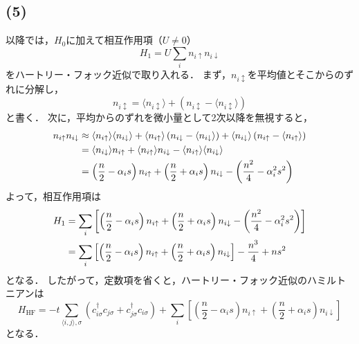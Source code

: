 \documentclass[a4paper,11pt]{jsarticle}
\begin{document}
\subsection*{(5)}
以降では，$H_0$に加えて相互作用項（$U\neq 0$）
\begin{equation}
  H_1 = U \sum_i n_{i\uparrow} n_{i\downarrow}
\end{equation}
をハートリー・フォック近似で取り入れる．
まず，$n_{i\updownarrow}$を平均値とそこからのずれに分解し，
\begin{equation}
  n_{i\updownarrow} = \langle n_{i\updownarrow} \rangle + \left(n_{i\updownarrow} - \langle n_{i\updownarrow} \rangle\right)
\end{equation}
と書く．
次に，平均からのずれを微小量として2次以降を無視すると，
\begin{align}
  n_{i\uparrow} n_{i\downarrow} 
  &\approx \langle n_{i\uparrow} \rangle \langle n_{i\downarrow} \rangle 
  + \langle n_{i\uparrow} \rangle \left(n_{i\downarrow} - \langle n_{i\downarrow} \rangle\right)
  + \langle n_{i\downarrow} \rangle \left(n_{i\uparrow} - \langle n_{i\uparrow} \rangle\right)\notag\\
  &= \langle n_{i\downarrow} \rangle n_{i\uparrow} + \langle n_{i\uparrow} \rangle n_{i\downarrow} - \langle n_{i\uparrow} \rangle \langle n_{i\downarrow} \rangle  \notag\\
  &= \left(\frac{n}{2}-\alpha_{i}s\right)n_{i\uparrow} + \left(\frac{n}{2}+\alpha_{i}s\right)n_{i\downarrow} - \left(\frac{n^2}{4} - \alpha_i^2 s^2\right)
\end{align}
よって，相互作用項は
\begin{align}
  H_1 &= \sum_i \left[ \left(\frac{n}{2}-\alpha_{i}s\right)n_{i\uparrow} + \left(\frac{n}{2}+\alpha_{i}s\right)n_{i\downarrow} - \left(\frac{n^2}{4} - \alpha_i^2 s^2\right) \right] \notag\\
  &= \sum_i \left[ \left(\frac{n}{2}-\alpha_{i}s\right)n_{i\uparrow} + \left(\frac{n}{2}+\alpha_{i}s\right)n_{i\downarrow} \right] - \frac{n^3}{4} + ns^2
\end{align}
となる．
したがって，定数項を省くと，ハートリー・フォック近似のハミルトニアンは
\begin{equation}
  H_{\mathrm{HF}} = -t \sum_{\langle i,j\rangle,\sigma}\left(c^{\dagger}_{i\sigma}c_{j\sigma} + c^{\dagger}_{j\sigma}c_{i\sigma}\right) + \sum_i \left[ \left(\frac{n}{2}-\alpha_{i}s\right)n_{i\uparrow} + \left(\frac{n}{2}+\alpha_{i}s\right)n_{i\downarrow} \right]
\end{equation}
となる．
\end{document}
